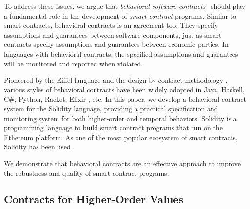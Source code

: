 To address these issues, we argue that \emph{behavioral software
contracts}~\cite{DBLP:conf/tools/Meyer98a} should play a fundamental role in
the development of \emph{smart contract} programs.
Similar to smart contracts, behavioral contracts is an agreement too. They
specify assumptions and guarantees between software components, just as
smart contracts specify assumptions and guarantees between economic parties.
In languages with behavioral contracts, the specified assumptions and
guarantees will be monitored and reported when violated.

Pioneered by the Eiffel language \cite{DBLP:books/ph/Meyer91} and the
design-by-contract methodology \cite{DBLP:conf/tools/Meyer98a}, various styles
of behavioral contracts have been widely adopted in Java, Haskell, C\#, Python,
Racket, Elixir \cite{DBLP:conf/erlang/0001BBHMEF22}, etc. 
In this paper, we develop a behavioral contract system \lang for the Solidity
language, providing a practical specification and monitoring system
for both higher-order and temporal behaviors.
Solidity is a programming language to build smart contract programs that run on
the Ethereum platform.  As one of the most popular ecosystem of smart
contracts, Solidity has been used .

We demonstrate that behavioral contracts are an effective approach
to improve the robustness and quality of smart contract programs.




\subsection*{\textbf{Contracts for Higher-Order Values}}


